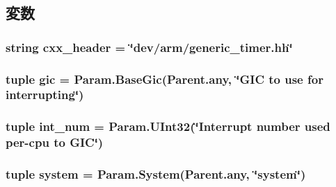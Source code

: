 \subsection{変数}
\hypertarget{classRealView_1_1GenericTimer_a17da7064bc5c518791f0c891eff05fda}{
\subsubsection[{cxx\_\-header}]{\setlength{\rightskip}{0pt plus 5cm}string {\bf cxx\_\-header} = \char`\"{}dev/arm/generic\_\-timer.hh\char`\"{}}}
\label{classRealView_1_1GenericTimer_a17da7064bc5c518791f0c891eff05fda}
\hypertarget{classRealView_1_1GenericTimer_a40243beb62d217c3a9e35801ae739fd0}{
\subsubsection[{gic}]{\setlength{\rightskip}{0pt plus 5cm}tuple {\bf gic} = Param.BaseGic(Parent.any, \char`\"{}GIC to use for interrupting\char`\"{})}}
\label{classRealView_1_1GenericTimer_a40243beb62d217c3a9e35801ae739fd0}
\hypertarget{classRealView_1_1GenericTimer_a65fded6db751c1b9aa7168b29056e819}{
\subsubsection[{int\_\-num}]{\setlength{\rightskip}{0pt plus 5cm}tuple {\bf int\_\-num} = Param.UInt32(\char`\"{}Interrupt number used per-\/cpu to GIC\char`\"{})}}
\label{classRealView_1_1GenericTimer_a65fded6db751c1b9aa7168b29056e819}
\hypertarget{classRealView_1_1GenericTimer_ab737471139f5a296e5b26e8a0e1b0744}{
\subsubsection[{system}]{\setlength{\rightskip}{0pt plus 5cm}tuple {\bf system} = Param.System(Parent.any, \char`\"{}system\char`\"{})}}
